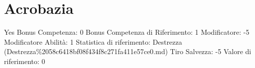 \section{Acrobazia}\label{acrobazia}

\begin{description}
\tightlist
\item[Tags: ABI]
Yes Bonus Competenza: 0 Bonus Competenza di Riferimento: 1 Modificatore:
-5 Modificatore Abilità: 1 Statistica di riferimento: Destrezza
(Destrezza\%2058c6418bf08f434f8c271fa411e57ce0.md) Tiro Salvezza: -5
Valore di riferimento: 0
\end{description}
